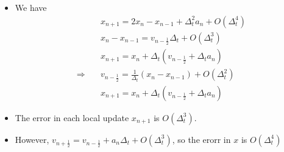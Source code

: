 \documentclass{beamer}
\begin{document}
\begin{frame}
  \begin{itemize}
    \item We have 
    \begin{align*}
      & x_{n+1}=2 x_n-x_{n-1}+\Delta_t^2 a_n+O\left(\Delta_t^4\right) \\
      & x_n-x_{n-1}=v_{n-\frac{1}{2}} \Delta_t+O\left(\Delta_t^3\right) \\
      & x_{n+1}=x_n+\Delta_t\left(v_{n-\frac{1}{2}}+\Delta_t a_n\right)\\
      \Rightarrow \quad & 
          v_{n-\frac{1}{2}}=\frac{1}{\Delta_t}\left(x_n-x_{n-1}\right)+O\left(\Delta_t^2\right) \\
          & x_{n+1}=x_n+\Delta_t\left(v_{n-\frac{1}{2}}+\Delta_t a_n\right)
    \end{align*}
    \item The error in each local update $x_{n+1}$ is  $O(\Delta_t^3)$. 
    \item However, $v_{n+\frac{1}{2}}=v_{n-\frac{1}{2}}+a_n \Delta_t+O\left(\Delta_t^3\right)$, 
    so the erorr in $x$ is $O\left(\Delta_t^4\right)$
  \end{itemize}
\end{frame}
\end{document}
